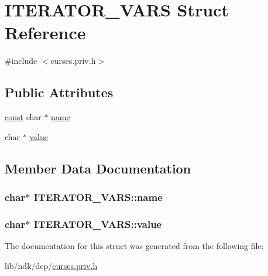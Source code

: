 \hypertarget{struct_i_t_e_r_a_t_o_r___v_a_r_s}{\section{I\-T\-E\-R\-A\-T\-O\-R\-\_\-\-V\-A\-R\-S Struct Reference}
\label{struct_i_t_e_r_a_t_o_r___v_a_r_s}
}


{\ttfamily \#include $<$curses.\-priv.\-h$>$}

\subsection*{Public Attributes}
\begin{DoxyCompactItemize}
\item 
\hyperlink{term__entry_8h_a57bd63ce7f9a353488880e3de6692d5a}{const} char $\ast$ \hyperlink{struct_i_t_e_r_a_t_o_r___v_a_r_s_a01ecfc89a919493bd0309277096e543b}{name}
\item 
char $\ast$ \hyperlink{struct_i_t_e_r_a_t_o_r___v_a_r_s_a706f988f39264ada15b0fb4dafae4efd}{value}
\end{DoxyCompactItemize}


\subsection{Member Data Documentation}
\hypertarget{struct_i_t_e_r_a_t_o_r___v_a_r_s_a01ecfc89a919493bd0309277096e543b}{
\subsubsection[{name}]{ char$\ast$ I\-T\-E\-R\-A\-T\-O\-R\-\_\-\-V\-A\-R\-S\-::name}}\label{struct_i_t_e_r_a_t_o_r___v_a_r_s_a01ecfc89a919493bd0309277096e543b}
\hypertarget{struct_i_t_e_r_a_t_o_r___v_a_r_s_a706f988f39264ada15b0fb4dafae4efd}{
\subsubsection[{value}]{\setlength{\rightskip}{0pt plus 5cm}char$\ast$ I\-T\-E\-R\-A\-T\-O\-R\-\_\-\-V\-A\-R\-S\-::value}}\label{struct_i_t_e_r_a_t_o_r___v_a_r_s_a706f988f39264ada15b0fb4dafae4efd}


The documentation for this struct was generated from the following file\-:\begin{DoxyCompactItemize}
\item 
lib/ndk/dep/\hyperlink{curses_8priv_8h}{curses.\-priv.\-h}\end{DoxyCompactItemize}
